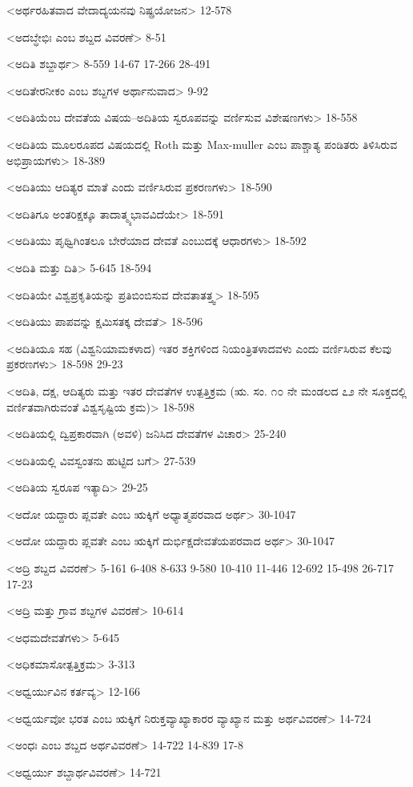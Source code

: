 <ಅರ್ಥರಹಿತವಾದ ವೇದಾದ್ಯಯನವು ನಿಷ್ಪ್ರಯೋಜನ>
12-578

<ಅದಬ್ಧೇಭಿಃ ಎಂಬ ಶಬ್ದದ ವಿವರಣೆ>
8-51

<ಅದಿತಿ ಶಬ್ದಾರ್ಥ>
8-559 
14-67 
17-266 
28-491

<ಅದಿತೇರನೀಕಂ ಎಂಬ ಶಬ್ದಗಳ ಅರ್ಥಾನುವಾದ>
9-92

<ಅದಿತಿಯೆಂಬ ದೇವತೆಯ ವಿಷಯ–ಅದಿತಿಯ ಸ್ವರೂಪವನ್ನು ವರ್ಣಿಸುವ ವಿಶೇಷಣಗಳು>
18-558

<ಅದಿತಿಯ ಮೂಲರೂಪದ ವಿಷಯದಲ್ಲಿ Roth ಮತ್ತು Max-muller ಎಂಬ ಪಾಶ್ಚಾತ್ಯ ಪಂಡಿತರು ತಿಳಿಸಿರುವ ಅಭಿಪ್ರಾಯಗಳು>
18-389

<ಅದಿತಿಯು ಆದಿತ್ಯರ ಮಾತೆ ಎಂದು ವರ್ಣಿಸಿರುವ ಪ್ರಕರಣಗಳು>
18-590

<ಅದಿತಿಗೂ ಅಂತರಿಕ್ಷಕ್ಕೂ ತಾದಾತ್ಮ್ಯಭಾವವಿದೆಯೇ>
18-591

<ಅದಿತಿಯು ಪೃಥ್ವಿಗಿಂತಲೂ ಬೇರೆಯಾದ ದೇವತೆ ಎಂಬುದಕ್ಕೆ ಆಧಾರಗಳು>
18-592

<ಅದಿತಿ ಮತ್ತು ದಿತಿ>
5-645
18-594

<ಅದಿತಿಯೇ ವಿಶ್ವಪ್ರಕೃತಿಯನ್ನು ಪ್ರತಿಬಿಂಬಿಸುವ ದೇವತಾತತ್ತ್ವ>
18-595

<ಅದಿತಿಯು ಪಾಪವನ್ನು ಕ್ಷಮಿಸತಕ್ಕ ದೇವತೆ>
18-596

<ಅದಿತಿಯೂ ಸಹ (ವಿಶ್ವನಿಯಾಮಕಳಾದ) ಇತರ ಶಕ್ತಿಗಳಿಂದ ನಿಯಂತ್ರಿತಳಾದವಳು ಎಂದು ವರ್ಣಿಸಿರುವ ಕೆಲವು ಪ್ರಕರಣಗಳು>
18-598 
29-23

<ಅದಿತಿ, ದಕ್ಷ, ಆದಿತ್ಯರು ಮತ್ತು ಇತರ ದೇವತೆಗಳ ಉತ್ಪತ್ತಿಕ್ರಮ (ಋ. ಸಂ. ೧೦ ನೇ ಮಂಡಲದ ೭೨ ನೇ ಸೂಕ್ತದಲ್ಲಿ ವರ್ಣಿತವಾಗಿರುವಂತೆ ವಿಶ್ವಸೃಷ್ಟಿಯ ಕ್ರಮ)>
18-598

<ಅದಿತಿಯಲ್ಲಿ ದ್ವಿಪ್ರಕಾರವಾಗಿ (ಅವಳಿ) ಜನಿಸಿದ ದೇವತೆಗಳ ವಿಚಾರ>
25-240

<ಅದಿತಿಯಲ್ಲಿ ವಿವಸ್ವಂತನು ಹುಟ್ಟಿದ ಬಗೆ>
27-539

<ಅದಿತಿಯ ಸ್ವರೂಪ ಇತ್ಯಾದಿ>
29-25

<ಅದೋ ಯದ್ದಾರು ಪ್ಲವತೇ ಎಂಬ ಋಕ್ಕಿಗೆ ಅಧ್ಯಾತ್ಮಪರವಾದ ಅರ್ಥ>
30-1047

<ಅದೋ ಯದ್ದಾರು ಪ್ಲವತೇ ಎಂಬ ಋಕ್ಕಿಗೆ ದುರ್ಭಿಕ್ಷದೇವತೆಯಪರವಾದ ಅರ್ಥ>
30-1047

<ಅದ್ರಿ ಶಬ್ದದ ವಿವರಣೆ>
5-161 
6-408 
8-633 
9-580 
10-410 
11-446
12-692 
15-498 
26-717 
17-23

<ಅದ್ರಿ ಮತ್ತು ಗ್ರಾವ ಶಬ್ದಗಳ ವಿವರಣೆ>
10-614

<ಅಧಮದೇವತೆಗಳು>
5-645

<ಅಧಿಕಮಾಸೋತ್ಪತ್ತಿಕ್ರಮ>
3-313

<ಅಧ್ವರ್ಯುವಿನ ಕರ್ತವ್ಯ>
12-166

<ಅಧ್ವರ್ಯವೋ ಭರತ ಎಂಬ ಋಕ್ಕಿಗೆ ನಿರುಕ್ತವ್ಯಾಖ್ಯಾಕಾರರ ವ್ಯಾಖ್ಯಾನ ಮತ್ತು ಅರ್ಥವಿವರಣೆ>
14-724

<ಅಂಧಃ ಎಂಬ ಶಬ್ದದ ಅರ್ಥವಿವರಣೆ>
14-722 
14-839 
17-8

<ಅಧ್ವರ್ಯು ಶಬ್ದಾರ್ಥವಿವರಣೆ>
14-721

